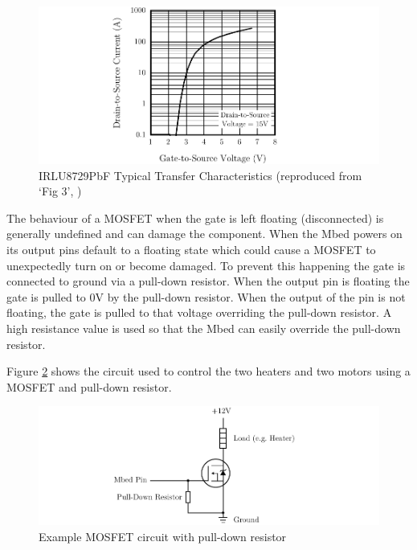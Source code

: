 				\begin{figure}
					\includegraphics[width=1\textwidth]{diagrams/mosfetPerformance.pdf}
					\caption{IRLU8729PbF Typical Transfer Characteristics (reproduced from
					`Fig 3', \cite{MOSFET})}
					\label{fig:mosfetPerformance}
				\end{figure}
				
				The behaviour of a MOSFET when the gate is left floating (disconnected)
				is generally undefined and can damage the component. When the Mbed
				powers on its output pins default to a floating state which could cause
				a MOSFET to unexpectedly turn on or become damaged. To prevent this
				happening the gate is connected to ground via a pull-down resistor. When
				the output pin is floating the gate is pulled to 0V by the pull-down
				resistor. When the output of the pin is not floating, the gate is pulled
				to that voltage overriding the pull-down resistor. A high resistance
				value is used so that the Mbed can easily override the pull-down
				resistor.
				
				Figure \ref{fig:mosfetUsage} shows the circuit used to control the two
				heaters and two motors using a MOSFET and pull-down resistor.
				
				\begin{figure}
					\includegraphics[width=1\textwidth]{diagrams/mosfetUsage.pdf}
					\caption{Example MOSFET circuit with pull-down resistor}
					\label{fig:mosfetUsage}
				\end{figure}
				
